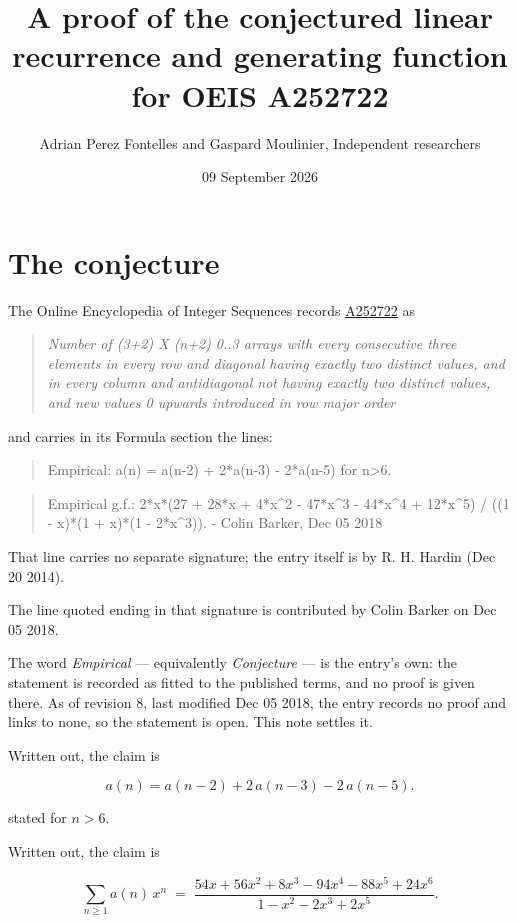 \documentclass[11pt]{article}
\title{A proof of the conjectured linear recurrence and generating function for OEIS A252722}
\author{Adrian Perez Fontelles and Gaspard Moulinier, Independent researchers}
\date{09 September 2026}
\theoremstyle{definition}
\begin{document}
\maketitle
\section{The conjecture}

The Online Encyclopedia of Integer Sequences records \href{https://oeis.org/A252722}{A252722} as

\begin{quote}\itshape Number of (3+2) X (n+2) 0..3 arrays with every consecutive three elements in every row and diagonal having exactly two distinct values, and in every column and antidiagonal not having exactly two distinct values, and new values 0 upwards introduced in row major order\end{quote}

and carries in its Formula section the lines:

\begin{quote}\ttfamily Empirical: a(n) = a(n-2) + 2*a(n-3) - 2*a(n-5) for n>6.\end{quote}

\begin{quote}\ttfamily Empirical g.f.: 2*x*(27 + 28*x + 4*x\textasciicircum{}2 - 47*x\textasciicircum{}3 - 44*x\textasciicircum{}4 + 12*x\textasciicircum{}5) / ((1 - x)*(1 + x)*(1 - 2*x\textasciicircum{}3)). - Colin Barker, Dec 05 2018\end{quote}

That line carries no separate signature; the entry itself is by R. H. Hardin (Dec 20 2014).

The line quoted ending in that signature is contributed by Colin Barker on Dec 05 2018.

The word {\itshape Empirical} --- equivalently {\itshape Conjecture} --- is the entry's own: the statement is recorded as fitted to the published terms, and no proof is given there. As of revision 8, last modified Dec 05 2018, the entry records no proof and links to none, so the statement is open. This note settles it.

Written out, the claim is

\[a(n) = a(n-2) + 2\,a(n-3) - 2\,a(n-5).\]

stated for $n > 6$.

Written out, the claim is

\[\sum_{n \ge 1} a(n)\,x^n \;=\; \frac{54x + 56x^{2} + 8x^{3} - 94x^{4} - 88x^{5} + 24x^{6}}{1 - x^{2} - 2x^{3} + 2x^{5}}.\]
\end{document}
